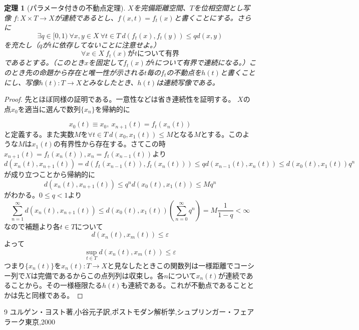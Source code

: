 \documentclass{jsarticle}
\newtheorem{thm}{定理}
\newcommand{\mgn}{\infty}
\begin{document}
\begin{thm}[パラメータ付きの不動点定理]$X$を完備距離空間、$T$を位相空間とし写像
$f:X\times T\to X$が連続であるとし、$f(x,t)=f_{t}(x)$と書くことにする。さらに
\[
\exists q\in [0,1)\ \forall x,y \in X\ \forall t\in T\ d(f_t(x),f_t(y))\le qd(x,y)
\]を充たし（$q$が$t$に依存してないことに注意せよ。）
\[
\forall x\in X\ f_t(x)がtについて有界
\]
であるとする。（このとき$x$を固定して$f_t(x)$が$t$について有界で連続になる。）このとき先の命題から存在と唯一性が示される$t$毎の$f_t$の不動点を$h(t)$と書くことにし、写像$h(t):T\to X$とみなしたとき、$h(t)$は連続写像である。

\end{thm}

\begin{proof}先とほぼ同様の証明である。一意性などは省き連続性を証明する。
$X$の点$x_0$を適当に選んで数列$\{x_n\}$を帰納的に

\[
x_0(t)\equiv x_0,\ x_{n+1}(t)=f_t(x_n(t))
\]
と定義する。また実数$M$を$\forall t\in T\ d(x_0,x_1(t))\le M$となる$M$とする。このような$M$は$x_1(t)$の有界性から存在する。さてこの時$x_{n+1}(t)=f_t(x_n(t)),x_n=f_t(x_{n-1}(t))$より
\[
d(x_n(t),x_{n+1}(t))=d(f_t(x_{n-1}(t)),f_t(x_n(t)))\le qd(x_{n-1}(t),x_n(t))\le d(x_0(t),x_1(t))q^n
\]
が成り立つことから帰納的に
\[
d(x_n(t),x_{n+1}(t))\le q^{n}d(x_0(t),x_1(t))\le Mq^n
\]
がわかる。$0\le q<1$より
\[
\sum_{n=1}^{\mgn}d(x_n(t),x_{n+1}(t))\le d(x_0(t),x_1(t))\left(\sum_{n=0}^{\mgn}q^n\right)=M\frac{1}{1-q}<\mgn
\]
なので補題より各$t\in T$について
\[
d(x_n(t),x_m(t))\le\varepsilon
\]
よって
\[
\sup_{t\in T}d(x_n(t),x_m(t))\le\varepsilon
\]
つまり$\{x_n(t)\}$を$x_n(t):T\to X$と見なしたときこの関数列は一様距離でコーシー列で$X$は完備であるからこの点列列は収束し。各$n$について$x_n(t)$が連続であることから。その一様極限たる$h(t)$も連続である。これが不動点であることとかは先と同様である。
\end{proof}












	
\begin{thebibliography}{9}
ユルゲン・ヨスト著,小谷元子訳,ポストモダン解析学,シュプリンガー・フェアラーク東京,2000

\end{thebibliography}
\end{document}
